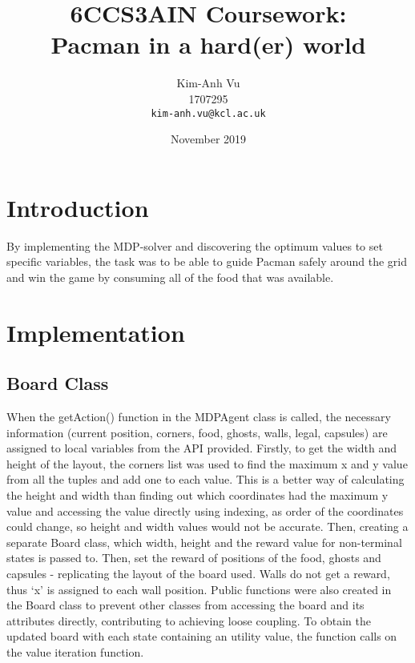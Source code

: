 \documentclass[a4paper]{report}
\title{6CCS3AIN Coursework: \\ Pacman in a hard(er) world}
\author{
  Kim-Anh Vu\\1707295\\
  \texttt{kim-anh.vu@kcl.ac.uk}
}
\date{November 2019}
\begin{document}
  \begin{titlepage}
    \maketitle
  \end{titlepage}
  \section*{Introduction}
    By implementing the MDP-solver and discovering the optimum values to set specific
    variables, the task was to be able to guide Pacman safely around the grid and
    win the game by consuming all of the food that was available.

    \section*{Implementation}
      \subsection*{Board Class}
        When the getAction() function in the MDPAgent class is called, the necessary information (current position, corners, food, ghosts, walls, legal, capsules) are assigned to local variables from the API provided.
        \newline \newline
        Firstly, to get the width and height of the layout, the corners list was used to find the maximum x and y value from all the tuples and add one to each value. This is a better way of calculating the height and width than finding out which coordinates had the maximum y value and accessing the value directly using indexing, as order of the coordinates could change, so height and width values would not be accurate.
        \newline \newline
        Then, creating a separate Board class, which width, height and the reward value for non-terminal states is passed to. Then, set the reward of positions of the food, ghosts and capsules - replicating the layout of the board used. Walls do not get a reward, thus `x' is assigned to each wall position. Public functions were also created in the Board class to prevent other classes from accessing the board and its attributes directly, contributing to achieving loose coupling.
        \newline \newline
        To obtain the updated board with each state containing an utility value, the function calls on the value iteration function.
\end{document}
